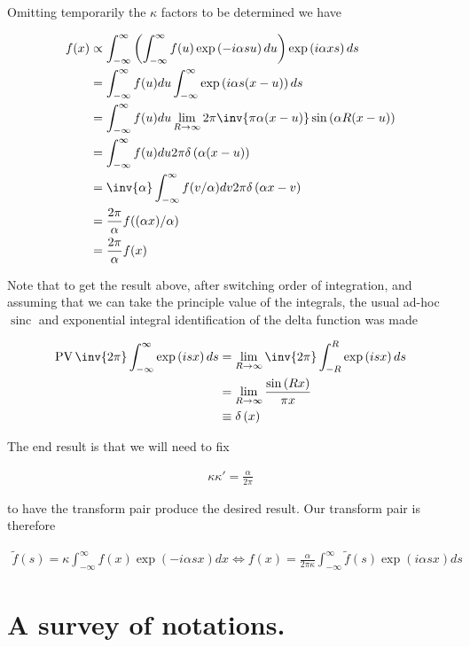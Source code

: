 \documentclass{article}
\newcommand{\IIinf}[0]{ \int_{-\infty}^\infty }
\DeclareMathOperator{\PV}{PV}
\DeclareMathOperator{\sinc}{sinc}
\begin{document}
Omitting temporarily the $\kappa$ factors to be determined we have 

\begin{align*}
f(x) 
&\propto \IIinf \left( \IIinf f(u) \exp\left( - i \alpha s u \right) du \right) \exp\left( i \alpha x s \right) ds \\
&= \IIinf f(u) du \IIinf \exp\left( i \alpha s (x-u) \right) ds \\
&= \IIinf f(u) du \lim_{R\rightarrow \infty} 2 \pi \inv{ \pi \alpha(x-u) }\sin\left( \alpha R (x-u) \right) \\
&= \IIinf f(u) du 2 \pi \delta\left( \alpha (x-u) \right) \\
&= \inv{\alpha} \IIinf f(v/\alpha) dv 2 \pi \delta\left( \alpha x - v \right) \\
&= \frac{2 \pi}{\alpha} f((\alpha x)/\alpha) \\
&= \frac{2 \pi}{\alpha} f(x)
\end{align*}

Note that to get the result above, after switching order of integration, and assuming that we can take the principle value of the integrals,
the usual ad-hoc $\sinc$ and exponential integral identification of the delta function was made

\begin{align*}
\PV \inv{2\pi} \IIinf \exp\left( i  s  x \right) ds 
&= \lim_{R \rightarrow \infty} \inv{2\pi} \int_{-R}^R \exp\left( i  s  x \right) ds \\
&= \lim_{R\rightarrow \infty} \frac{\sin\left(  R  x \right)}{ \pi  x } \\
&\equiv \delta\left( x \right) \\
\end{align*}

The end result is that we will need to fix

\begin{align*}
\kappa \kappa' = \frac{\alpha}{2\pi}
\end{align*}

to have the transform pair produce the desired result.  Our transform pair is therefore

\begin{align}\label{eqn:blah}
\tilde{f}(s) = \kappa \IIinf f(x) \exp\left( - i \alpha s x \right) dx \Leftrightarrow f(x) = {\frac{ \alpha} {2 \pi \kappa} } \IIinf \tilde{f}(s) \exp\left( i \alpha s x \right) ds
\end{align}

\section{ A survey of notations. }
\end{document}
